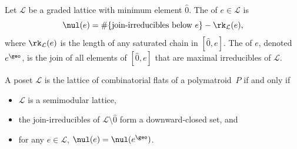 Let $\mathcal L$ be a graded lattice with minimum element $\hat 0$.
The  of $e \in \mathcal L$ is
\[
  \nul(e) = \#\{\text{join-irreducibles below $e$}\} - \rk_{\mathcal L}(e),
\]
where  $\rk_{\mathcal L}(e)$ is the length of any saturated chain in $[\hat 0, e]$.
The  of $e$, denoted $e^\geo$, is the join of all elements of $[\hat 0, e]$ that are maximal irreducibles of $\mathcal L$.
\begin{theo}\label{latticeaxiom}
  A  poset $\mathcal L$ is the lattice of combinatorial flats of a polymatroid~$P$ if and only if
  \begin{itemize}
  \item $\mathcal L$ is a semimodular lattice,
  \item the join-irreducibles of $\mathcal L \setminus \hat 0$ form a downward-closed set, and 
  \item for any $e \in \mathcal L$, $\nul(e) = \nul(e^\geo)$.
  \end{itemize}
\end{theo}
